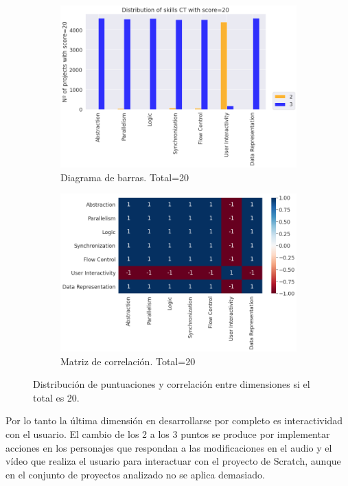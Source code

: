 \documentclass[a4paper, 12pt]{book}
\begin{document}
\begin{figure}[H]
    \centering
    \begin{subfigure}[h]{.49\textwidth} 
        \includegraphics[width=\textwidth]{img/distribucion_20_Scratch}
        \caption{Diagrama de barras. Total=20}
        \label{fig:total20}
    \end{subfigure}       
    \begin{subfigure}[h]{.49\textwidth} 
        \includegraphics[width=\textwidth]{img/corr_20_Scratch}
        \caption{Matriz de correlación. Total=20}
        \label{fig:corr20}
    \end{subfigure}
     \caption{Distribución de puntuaciones y correlación entre dimensiones si el total es 20.}
\end{figure}

Por lo tanto la última dimensión en desarrollarse por completo es interactividad con el usuario. El cambio de los 2 a los 3 puntos se produce por implementar acciones en los personajes que respondan a las modificaciones en el audio y el vídeo que realiza el usuario para interactuar con el proyecto de Scratch, aunque en el conjunto de proyectos analizado no se aplica demasiado.
\end{document}
